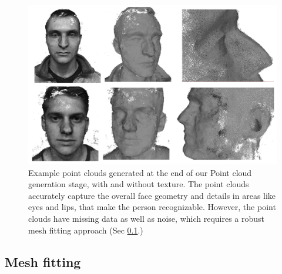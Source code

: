 \documentclass[10pt,twocolumn,letterpaper]{article}
\begin{document}
\begin{figure}[t]
\begin{center}
   \includegraphics[width=0.95\linewidth]{images/point_clouds_sample.png}
\end{center}
   \caption{Example point clouds generated at the end of our Point cloud generation stage, with and without texture. The point clouds accurately capture the overall face geometry and details in areas like eyes and lips, that make the person recognizable. However, the point clouds have missing data as well as noise, which requires a robust mesh fitting approach (Sec \ref{sec:mesh_fit}.)  }
\label{fig:pcl_sample}
\end{figure}

\subsection{Mesh fitting} \label{sec:mesh_fit}
\end{document}
